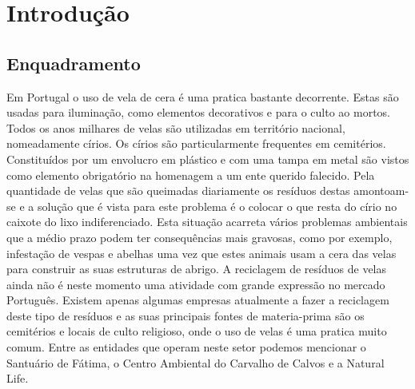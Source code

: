 \chapter{Introdução}
\label{cap:1}

\section{Enquadramento}
Em Portugal o uso de vela de cera é uma pratica bastante decorrente. Estas são usadas para iluminação, como elementos decorativos e para o culto ao mortos. Todos os anos milhares de velas são utilizadas em território nacional, nomeadamente círios. Os círios são particularmente frequentes em cemitérios. Constituídos por um envolucro em plástico e com uma tampa em metal são vistos como elemento obrigatório na homenagem a um ente querido falecido. Pela quantidade de velas que são queimadas diariamente os resíduos destas amontoam-se e a solução que é vista para este problema é o colocar o que resta do círio no caixote do lixo indiferenciado. Esta situação acarreta vários problemas ambientais que a médio prazo podem ter consequências mais gravosas, como por exemplo, infestação de vespas e abelhas uma vez que estes animais usam a cera das velas para construir as suas estruturas de abrigo.
A reciclagem de resíduos de velas ainda não é neste momento uma atividade com grande expressão no mercado Português. Existem apenas algumas empresas atualmente a fazer a reciclagem deste tipo de resíduos e as suas principais fontes de materia-prima são os cemitérios e locais de culto religioso, onde o uso de velas é uma pratica muito comum. Entre as entidades que operam neste setor podemos mencionar o Santuário de Fátima\cite{Destak2010}, o Centro Ambiental do Carvalho de Calvos\cite{SecundinoCunha2016} e a Natural Life\cite{NaturalLife}.

